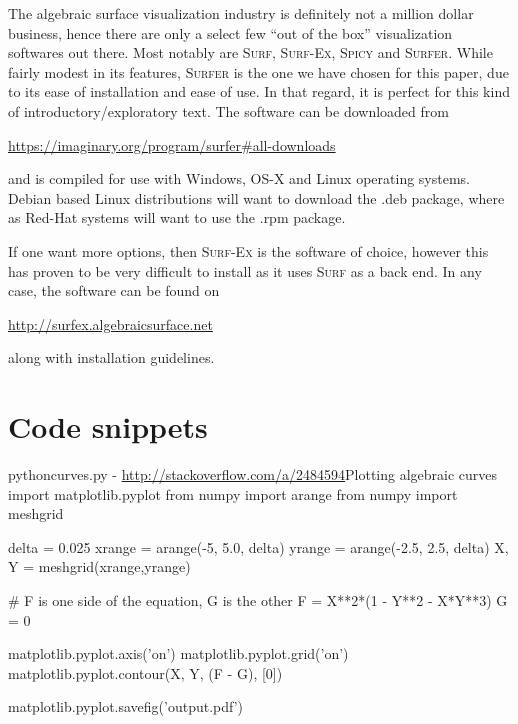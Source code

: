 \documentclass{article}
\begin{document}
    The algebraic surface visualization industry is definitely not a million
    dollar business, hence there are only a select few ``out of the box''
    visualization softwares out there. Most notably are \textsc{Surf},
    \textsc{Surf-Ex}, \textsc{Spicy} and \textsc{Surfer}. While fairly modest
    in its features, \textsc{Surfer} is the one we have chosen for this paper,
    due to its ease of installation and ease of use. In that regard, it is
    perfect for this kind of introductory/exploratory text.  The software can
    be downloaded from
    \begin{center}
        \url{https://imaginary.org/program/surfer#all-downloads}
    \end{center}
    and is compiled for use with Windows, \textsc{OS-X} and Linux operating
    systems. Debian based Linux distributions will want to download the
    \textsf{.deb} package, where as Red-Hat systems will want to use the
    \textsf{.rpm} package.
  
    If one want more options, then \textsc{Surf-Ex} is the software of choice,
    however this has proven to be very difficult to install as it uses
    \textsc{Surf} as a back end. In any case, the software can be found on
    \begin{center}
        \url{http://surfex.algebraicsurface.net} 
    \end{center}
    along with installation guidelines.

    \section{Code snippets}
    \label{sec:code_snippets}
        
    \begin{TMcode}{python}{curves.py -
        \url{http://stackoverflow.com/a/2484594}}{Plotting algebraic curves}
    import matplotlib.pyplot
    from numpy import arange
    from numpy import meshgrid

    delta = 0.025
    xrange = arange(-5, 5.0, delta)
    yrange = arange(-2.5, 2.5, delta)
    X, Y = meshgrid(xrange,yrange)

    # F is one side of the equation, G is the other
    F = X**2*(1 - Y**2 - X*Y**3)
    G = 0

    matplotlib.pyplot.axis('on')
    matplotlib.pyplot.grid('on')
    matplotlib.pyplot.contour(X, Y, (F - G), [0])

    matplotlib.pyplot.savefig('output.pdf')
    \end{TMcode}
\end{document}
